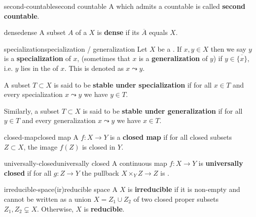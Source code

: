 \begin{topic}{second-countable}{second countable}
    A  which admits a countable  is called \textbf{second countable}.
\end{topic}

\begin{topic}{dense}{dense}
    A subset $A$ of a  $X$ is \textbf{dense} if its  $\overline{A}$ equals $X$.
\end{topic}

\begin{topic}{specialization}{specialization / generalization}
    Let $X$ be a . If $x, y \in X$ then we say $y$ is a \textbf{specialization} of $x$, (sometimes that $x$ is a \textbf{generalization} of $y$) if $y \in \overline{\{ x \}}$, i.e. $y$ lies in the  of $x$. This is denoted as $x \leadsto y$.
    
    A subset $T \subset X$ is said to be \textbf{stable under specialization} if for all $x \in T$ and every specialization $x \leadsto y$ we have $y \in T$.
    
    Similarly, a subset $T \subset X$ is said to be \textbf{stable under generalization} if for all $y \in T$ and every generalization $x \leadsto y$ we have $x \in T$.
\end{topic}

\begin{topic}{closed-map}{closed map}
    A  $f : X \to Y$ is a \textbf{closed map} if for all closed subsets $Z \subset X$, the image $f(Z)$ is closed in $Y$.
\end{topic}

\begin{topic}{universally-closed}{universally closed}
    A continuous map $f : X \to Y$ is \textbf{universally closed} if for all $g : Z \to Y$ the pullback $X \times_Y Z \to Z$ is .
\end{topic}

\begin{topic}{irreducible-space}{(ir)reducible space}
    A  $X$ is \textbf{irreducible} if it is non-empty and cannot be written as a union $X = Z_1 \cup Z_2$ of two closed proper subsets $Z_1, Z_2 \subsetneq X$. Otherwise, $X$ is \textbf{reducible}.
\end{topic}

